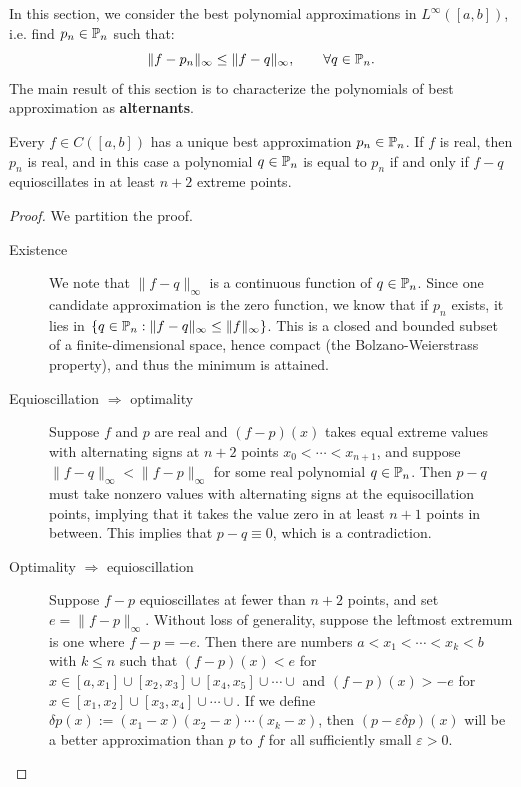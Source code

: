 In this section, we consider the best polynomial approximations in $L^\infty([a,b])$, i.e. find $p_n\in\P_n$ such that:
\[
\|f-p_n\|_\infty \le \|f-q\|_\infty,\qquad\forall q\in\P_n.
\]
The main result of this section is to characterize the polynomials of best approximation as {\bf alternants}.
\begin{theorem}\label{theorem:Equioscillation}
Every $f\in C([a,b])$ has a unique best approximation $p_n\in\P_n$. If $f$ is real, then $p_n$ is real, and in this case a polynomial $q\in\P_n$ is equal to $p_n$ if and only if $f-q$ equioscillates in at least $n+2$ extreme points.
\end{theorem}
\begin{proof}
We partition the proof.
\begin{description}
\item[Existence] We note that $\|f-q\|_\infty$ is a continuous function of $q\in\P_n$. Since one candidate approximation is the zero function, we know that if $p_n$ exists, it lies in $\{q\in\P_n : \|f-q\|_\infty \le \|f\|_\infty\}$. This is a closed and bounded subset of a finite-dimensional space, hence compact (the Bolzano-Weierstrass property), and thus the minimum is attained.
\item[Equioscillation $\Longrightarrow$ optimality] Suppose $f$ and $p$ are real and $(f-p)(x)$ takes equal extreme values with alternating signs at $n+2$ points $x_0<\cdots<x_{n+1}$, and suppose $\|f-q\|_\infty < \|f-p\|_\infty$ for some real polynomial $q\in\P_n$. Then $p-q$ must take nonzero values with alternating signs at the equisocillation points, implying that it takes the value zero in at least $n+1$ points in between. This implies that $p-q\equiv0$, which is a contradiction.
\item[Optimality $\Longrightarrow$ equioscillation] Suppose $f-p$ equioscillates at fewer than $n+2$ points, and set $e = \|f-p\|_\infty$. Without loss of generality, suppose the leftmost extremum is one where $f-p = -e$. Then there are numbers $a < x_1 < \cdots < x_k < b$ with $k\le n$ such that $(f-p)(x) < e$ for $x\in[a,x_1]\cup[x_2,x_3]\cup[x_4,x_5]\cup\cdots\cup$ and $(f-p)(x)>-e$ for $x\in[x_1,x_2]\cup[x_3,x_4]\cup\cdots\cup$. If we define $\delta p(x) := (x_1-x)(x_2-x)\cdots(x_k-x)$, then $(p-\varepsilon\delta p)(x)$ will be a better approximation than $p$ to $f$ for all sufficiently small $\varepsilon>0$.

\end{description}
\end{proof}
